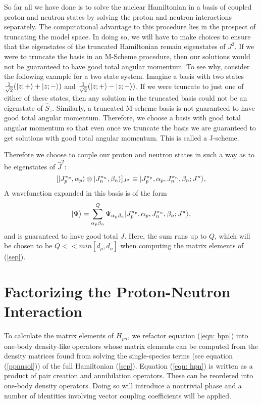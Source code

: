 So far all we have done is to solve the nuclear Hamiltonian in a basis of
coupled proton and neutron states by solving the proton and neutron 
interactions separately. The computational advantage to this
procedure lies in the prospect of truncating the model space. In doing so, we 
will have to make choices to ensure that the eigenstates of the truncated
Hamiltonian remain eigenstates of $J^2$. 
If we were to truncate the basis in an M-Scheme procedure, then our
solutions would not be guaranteed to have good total angular momentum. To see why,
consider the following example for a two state system. Imagine a basis with two
states $\frac{1}{\sqrt{2}}(|z;+\rangle+|z;-\rangle)$ and
$\frac{1}{\sqrt{2}}(|z;+\rangle-|z;-\rangle)$. If we were
truncate to just one of either of these states, then any solution in the truncated
basis could not be an eigenstate of $\hat{S}_z$. Similarly, a truncated M-scheme
basis is not guaranteed to have good total angular momentum. Therefore,
we choose a basis with good total angular momentum so that even once we
truncate the basis we are guaranteed to get solutions with good total angular momentum.
This is called a J-scheme.

Therefore we choose to couple our proton and neutron states in such a way as to
be eigenstates of $\hat{J}^2$:
\begin{equation}\label{cbasisJ}
	[|J_p^{\pi_p},\alpha_p\rangle\otimes|J_n^{\pi_n},\beta_n\rangle]_{J^\pi}\equiv
	|J_p^{\pi_p},\alpha_p,J_n^{\pi_n},\beta_n;J^\pi\rangle,
\end{equation}
A wavefunction expanded in this basis is of the form
\begin{equation}
    |\Psi\rangle = \sum_{\alpha_p\beta_n}^{Q}\Psi_{\alpha_p\beta_n} 
    |J_p^{\pi_p},\alpha_p,J_n^{\pi_n},\beta_n;J^\pi\rangle,
\end{equation}
and is guaranteed to have good total $J$. Here, the sum runs up to $Q$, which
will be chosen to be $Q << min[d_p,d_n]$ when computing the matrix elements of 
(\ref{sep}).





\section{Factorizing the Proton-Neutron Interaction}

To calculate the matrix elements of $H_{pn}$, we refactor equation (\ref{eqn: hpn})
into one-body density-like operators whose matrix elements can be computed from the density 
matrices found from solving the single-species terms (see equation (\ref{ppnnsol}))
of the full Hamiltonian (\ref{sep}). Equation (\ref{eqn: hpn}) is written
as a product of pair creation and annihilation operators. These can be reordered
into one-body density operators. Doing so will introduce a nontrivial phase and
a number of identities involving vector coupling coefficients will be applied.


